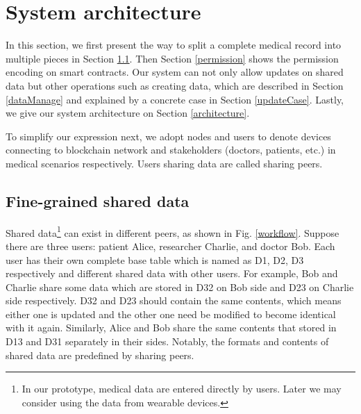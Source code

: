 \documentclass[conference]{IEEEtran}
\begin{document}


\section{System architecture}
\label{system}

In this section, we first present the way to split a complete medical record into multiple pieces in Section \ref{fine-grained}. Then Section \ref{permission} shows the permission encoding on smart contracts. Our system can not only allow updates on shared data but other operations such as creating data, which are described in Section \ref{dataManage} and explained by a concrete case in Section \ref{updateCase}. Lastly, we give our system architecture on Section \ref{architecture}.
     
To simplify our expression next, we adopt nodes and users to denote devices connecting to blockchain network and stakeholders (doctors, patients, etc.) in medical scenarios respectively. Users sharing data are called sharing peers.
     
\subsection{Fine-grained shared data}
\label{fine-grained}


Shared data\footnote{In our prototype, medical data are entered directly by users. Later we may consider using the data from wearable devices.} can exist in different peers, as shown in Fig. \ref{workflow}.  Suppose there are three users: patient Alice, researcher Charlie, and doctor Bob. Each user has their own complete base table which is named as D1, D2, D3 respectively and different shared data with other users. For example, Bob and Charlie share some data which are stored in D32 on Bob side and D23 on Charlie side respectively. D32 and D23 should contain the same contents, which means either one is updated and the other one need be modified to become identical with it again. Similarly, Alice and Bob share the same contents that stored in D13 and D31 separately in their sides. Notably, the formats and contents of shared data are predefined by sharing peers. 
\end{document}
